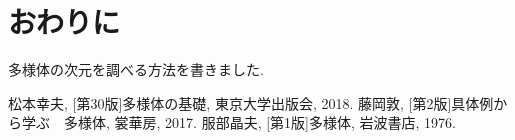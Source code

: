 \documentclass[a4j,12pt]{jarticle}
\theoremstyle{definition}
\begin{document}
\section{おわりに}
多様体の次元を調べる方法を書きました.

\newpage
\begin{thebibliography}{99}
 松本幸夫, [第30版]多様体の基礎, 東京大学出版会, 2018.
 藤岡敦, [第2版]具体例から学ぶ　多様体, 裳華房, 2017.
 服部晶夫, [第1版]多様体, 岩波書店, 1976.
\end{thebibliography}
\end{document}
